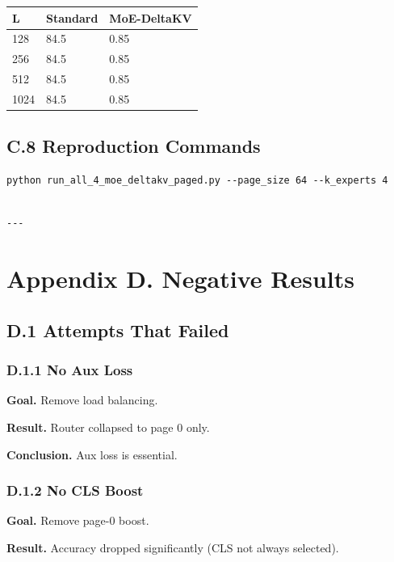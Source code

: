 \begin{table}[H]
\centering
\small
\begin{tabular}{lll}
\toprule
\textbf{L} & \textbf{Standard} & \textbf{MoE-DeltaKV} \\
\midrule
128 & 84.5 & 0.85 \\
256 & 84.5 & 0.85 \\
512 & 84.5 & 0.85 \\
1024 & 84.5 & 0.85 \\
\bottomrule
\end{tabular}
\end{table}

\subsection{C.8 Reproduction Commands}

\begin{lstlisting}
python run_all_4_moe_deltakv_paged.py --page_size 64 --k_experts 4
\end{lstlisting}
\begin{lstlisting}

---
\end{lstlisting}

\section{Appendix D. Negative Results}

\subsection{D.1 Attempts That Failed}

\subsubsection{D.1.1 No Aux Loss}

\textbf{Goal.} Remove load balancing.

\textbf{Result.} Router collapsed to page 0 only.

\textbf{Conclusion.} Aux loss is essential.

\subsubsection{D.1.2 No CLS Boost}

\textbf{Goal.} Remove page-0 boost.

\textbf{Result.} Accuracy dropped significantly (CLS not always selected).

